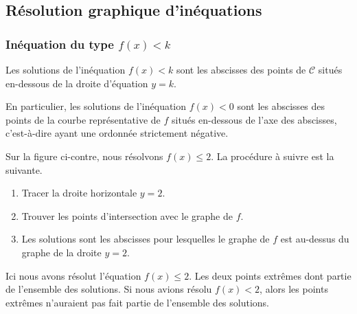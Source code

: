 \subsection{Résolution graphique d'inéquations}


\subsubsection{Inéquation du type $f(x)<k$}

\begin{Aretenir}
Les solutions de l'inéquation $f(x)<k$ sont les abscisses des points de $\mathscr{C}$ situés en-dessous de la droite d'équation $y=k$.

En particulier, les solutions de l'inéquation $f(x)<0$ sont les abscisses des points de la courbe représentative de \( f\) situés en-dessous de l'axe des abscisses, c'est-à-dire ayant une ordonnée strictement négative.
\end{Aretenir}

\begin{multicols}{2}
    Sur la figure ci-contre, nous résolvons \( f(x)\leq 2\). La procédure à suivre est la suivante.
    \begin{enumerate}
        \item
            Tracer la droite horizontale \( y=2\).
        \item
            Trouver les points d'intersection avec le graphe de \( f\).
        \item
            Les solutions sont les abscisses pour lesquelles le graphe de \( f\) est au-dessus du graphe de la droite \( y=2\).
    \end{enumerate}

    \columnbreak

    

\end{multicols}


\begin{remark}
    Ici nous avons résolut l'équation \( f(x)\leq 2\). Les deux points extrêmes dont partie de l'ensemble des solutions. Si nous avions résolu \( f(x)<2\), alors les points extrêmes n'auraient pas fait partie de l'ensemble des solutions.
\end{remark}

